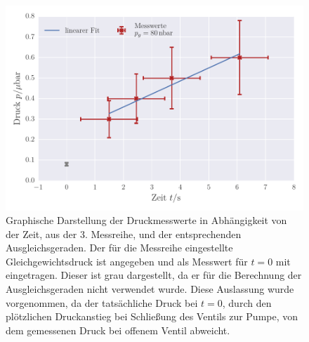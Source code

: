 \begin{figure}[!h]
 \centering
 \includegraphics[scale=0.65]{../Grafiken/Leckrate_Turbo_2.pdf}
 \caption{Graphische Darstellung der Druckmesswerte in Abhängigkeit von der Zeit, aus der 3. Messreihe, und der
 	entsprechenden Ausgleichsgeraden. Der für die Messreihe eingestellte Gleichgewichtsdruck ist angegeben und als Messwert für $t=0$ mit eingetragen. Dieser ist grau dargestellt, da er für die 
 	Berechnung der Ausgleichsgeraden nicht verwendet wurde. Diese Auslassung wurde vorgenommen, da
 	der tatsächliche Druck bei $t=0$, durch den plötzlichen Druckanstieg bei Schließung des Ventils zur Pumpe, von dem
 	gemessenen Druck bei offenem Ventil abweicht.  \label{fig:leckrate_turbo_2}}
 \end{figure} 